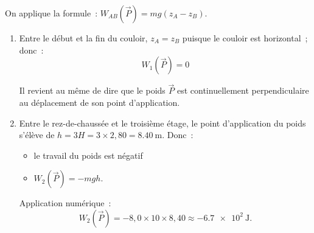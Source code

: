 On applique la formule~: $W_{AB}(\vec{P})=mg(z_{A}-z_{B})$.
\begin{enumerate}
    \item Entre le début et la fin du couloir, $z_{A}=z_{B}$ puisque le couloir
          est horizontal~; donc~:
          \[
              W_1(\vec{P})=0
          \]
    
          Il revient au même de dire que le poids $\vec{P}$ est continuellement
          perpendiculaire au déplacement de son point d'application.

    \item Entre le rez-de-chaussée et le troisième étage, le point d'application
          du poids s'élève de $h=3 H=3 \times 2,80=\qty{8.40}{\m}$. Donc~:
          \begin{itemize}
              \item le travail du poids est négatif
              \item $W_2(\vec{P})=-mgh$.
          \end{itemize}
    
          Application numérique~:
          \[
              W_2(\vec{P})=-8,0 \times 10 \times 8,40 \approx \qty{-6.7e2}{\J}.
          \]
\end{enumerate}

